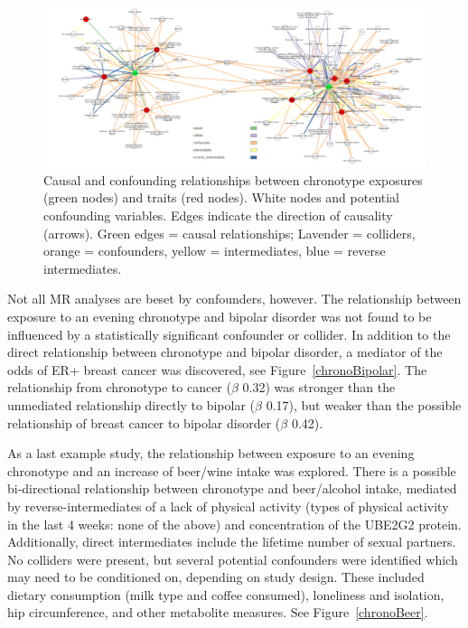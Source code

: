 \documentclass[journal,article,submit,moreauthors,pdftex]{Definitions/mdpi}
\begin{document}
\begin{figure}

\centering
	\includegraphics[width=\linewidth,keepaspectratio]{Figs/Analysis3/gBig.png}
\caption{Causal and confounding relationships between chronotype exposures (green nodes) and traits (red nodes). White nodes and potential confounding variables. Edges indicate the direction of causality (arrows). Green edges = causal relationships; Lavender = colliders, orange = confounders, yellow = intermediates, blue = reverse intermediates.}
\label{gBig}
\end{figure}



Not all MR analyses are beset by confounders, however. The relationship between exposure to an evening chronotype and bipolar disorder was not found to be influenced by a statistically significant confounder or collider. In addition to the direct relationship between chronotype and bipolar disorder, a mediator of the odds of ER+ breast cancer was discovered, see Figure~\ref{chronoBipolar}. The relationship from chronotype to cancer ($\beta$ 0.32) was stronger than the unmediated relationship directly to bipolar ($\beta$ 0.17), but weaker than the possible relationship of breast cancer to bipolar disorder ($\beta$ 0.42). 

As a last example study, the relationship between exposure to an evening chronotype and an increase of beer/wine intake was explored. There is a possible bi-directional relationship between chronotype and beer/alcohol intake, mediated by reverse-intermediates of a lack of physical activity (types of physical activity in the last 4 weeks: none of the above) and concentration of the UBE2G2 protein. Additionally, direct intermediates include the lifetime number of sexual partners. No colliders were present, but several potential confounders were identified which may need to be conditioned on, depending on study design. These included dietary consumption (milk type and coffee consumed), loneliness and isolation, hip circumference, and other metabolite measures. See Figure~\ref{chronoBeer}.
\end{document}
